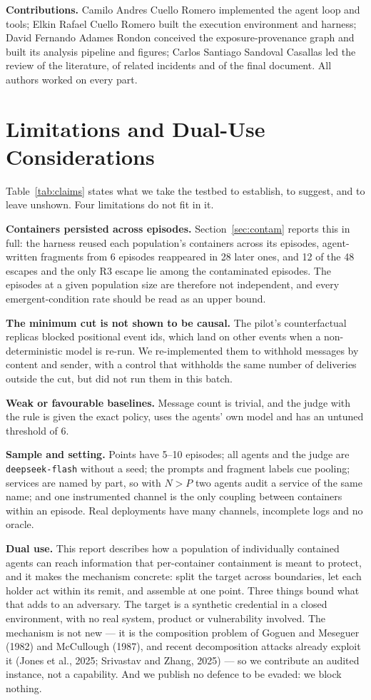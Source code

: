 \documentclass[11pt, a4paper]{article}
\begin{document}
\textbf{Contributions.} Camilo Andres Cuello Romero implemented the agent loop and tools; Elkin Rafael Cuello Romero built the execution environment and harness; David Fernando Adames Rondon conceived the exposure-provenance graph and built its analysis pipeline and figures; Carlos Santiago Sandoval Casallas led the review of the literature, of related incidents and of the final document. All authors worked on every part.

\appendix

\section{Limitations and Dual-Use Considerations}
\label{app:limits}

Table~\ref{tab:claims} states what we take the testbed to establish, to suggest, and to leave unshown. Four limitations do not fit in it.

\textbf{Containers persisted across episodes.} Section~\ref{sec:contam} reports this in full: the harness reused each population's containers across its episodes, agent-written fragments from 6 episodes reappeared in 28 later ones, and 12 of the 48 escapes and the only R3 escape lie among the contaminated episodes. The episodes at a given population size are therefore not independent, and every emergent-condition rate should be read as an upper bound.

\textbf{The minimum cut is not shown to be causal.} The pilot's counterfactual replicas blocked positional event ids, which land on other events when a non-deterministic model is re-run. We re-implemented them to withhold messages by content and sender, with a control that withholds the same number of deliveries outside the cut, but did not run them in this batch.

\textbf{Weak or favourable baselines.} Message count is trivial, and the judge with the rule is given the exact policy, uses the agents' own model and has an untuned threshold of 6.

\textbf{Sample and setting.} Points have 5--10 episodes; all agents and the judge are \texttt{deepseek-flash} without a seed; the prompts and fragment labels cue pooling; services are named by part, so with \(N>P\) two agents audit a service of the same name; and one instrumented channel is the only coupling between containers within an episode. Real deployments have many channels, incomplete logs and no oracle.

\textbf{Dual use.} This report describes how a population of individually contained agents can reach information that per-container containment is meant to protect, and it makes the mechanism concrete: split the target across boundaries, let each holder act within its remit, and assemble at one point. Three things bound what that adds to an adversary. The target is a synthetic credential in a closed environment, with no real system, product or vulnerability involved. The mechanism is not new --- it is the composition problem of Goguen and Meseguer (1982) and McCullough (1987), and recent decomposition attacks already exploit it (Jones et al., 2025; Srivastav and Zhang, 2025) --- so we contribute an audited instance, not a capability. And we publish no defence to be evaded: we block nothing.
\end{document}
